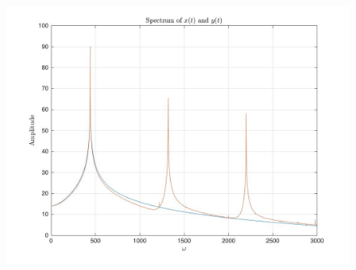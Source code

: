 \documentclass{article}
\begin{document}
\begin{figure}[!htbp]
\begin{minipage}{\linewidth}
\includegraphics[width = 1\linewidth, height = 0.5\textheight]{trumpet.jpg}
\end{minipage}
\end{figure}

\FloatBarrier
\end{document}
